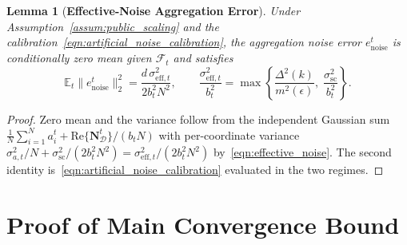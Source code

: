 \documentclass[journal]{IEEEtran}
\newtheorem{lemma}{Lemma}
\begin{document}
\begin{lemma}[\bf Effective-Noise Aggregation Error]
    \label{lemma:noise_error}
    Under Assumption~\ref{assum:public_scaling} and the calibration~\eqref{eqn:artificial_noise_calibration}, the aggregation noise error $e_{\mathrm{noise}}^t$ is conditionally zero mean given $\mathcal F_t$ and satisfies
    \begin{equation}
        \mathbb E_t\|e_{\mathrm{noise}}^t\|_2^2
        =\frac{d\,\sigma_{\mathrm{eff},t}^2}{2 b_t^2 N^2},
        \qquad
        \frac{\sigma_{\mathrm{eff},t}^2}{b_t^2}
        =\max\left\{\frac{\Delta^2(k)}{m^2(\epsilon)},\;\frac{\sigma_{\mathrm{sc}}^2}{b_t^2}\right\}.
    \end{equation}
\end{lemma}
\begin{proof}
    Zero mean and the variance follow from the independent Gaussian sum $\frac1N\sum_{i=1}^Na_i^t+\mathrm{Re}\{\mathbf N_{\mathcal D}^t\}/(b_tN)$ with per-coordinate variance $\sigma_{a,t}^2/N+\sigma_{\mathrm{sc}}^2/(2b_t^2N^2)=\sigma_{\mathrm{eff},t}^2/(2b_t^2N^2)$ by~\eqref{eqn:effective_noise}. The second identity is~\eqref{eqn:artificial_noise_calibration} evaluated in the two regimes.
\end{proof}

\section{Proof of Main Convergence Bound}
\end{document}
